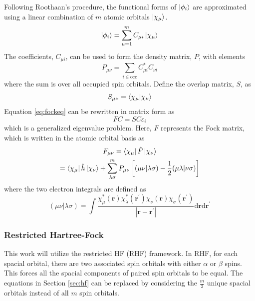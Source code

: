 \documentclass[final,3p,times,twocolumn]{elsarticle}
\begin{document}
Following Roothaan's procedure,\cite{roothaan} the functional forms of $\ket{\phi_i}$ are approximated using a linear combination of $m$ atomic orbitals $\ket{\chi_\mu}$.
\begin{equation}
\ket{\phi_i} = \sum_{\mu=1}^m C_{\mu i} \ket{\chi_\mu}
\end{equation}
The coefficients, $C_{\mu i}$, can be used to form the density matrix, $P$, with elements
\begin{equation} \label{eq:density}
P_{\mu \nu} = \sum_{i\in\text{occ}} C_{\mu i}^*C_{\nu i}
\end{equation}
where the sum is over all occupied spin orbitals. Define the overlap matrix, $S$, as
\begin{equation}
S_{\mu \nu} = \bra{\chi_\mu}\ket{\chi_\nu}
\end{equation}
Equation \eqref{eq:fockeq} can be rewritten in matrix form as
\begin{equation}\label{eq:fock}
FC = SC\varepsilon_i
\end{equation}
which is a generalized eigenvalue problem. Here, $F$ represents the Fock matrix, which is written in the atomic orbital basis as
\begin{equation} \label{eq:fockmat}
\begin{gathered}
F_{\mu\nu} = \bra{\chi_\mu} \hat F \ket{\chi_\nu} \\
= \bra{\chi_\mu} \hat h \ket{\chi_\nu} + \sum_{\lambda\sigma}^m P_{\mu\nu} \left[ (\mu\nu|\lambda\sigma) - \frac{1}{2}(\mu\lambda|\nu\sigma)\right]
\end{gathered}
\end{equation} 
where the two electron integrals are defined as
\begin{equation} \label{eq:2e}
(\mu\nu|\lambda\sigma) = \int \frac{\chi_\mu^*(\mathbf{r})\chi_\lambda^*(\mathbf{r}^\prime)\chi_\nu(\mathbf{r})\chi_\sigma(\mathbf{r}^\prime)}{|\mathbf{r}-\mathbf{r}^\prime|} \mathrm{d}\mathbf{r}\mathrm{d}\mathbf{r}^\prime
\end{equation}

\subsubsection{Restricted Hartree-Fock} \label{sec:rhf}
This work will utilize the restricted HF (RHF) framework. In RHF, for each spacial orbital, there are two associated spin orbitals with either $\alpha$ or $\beta$ spins. This forces all the spacial components of paired spin orbitals to be equal. The equations in Section \ref{sec:hf} can be replaced by considering the $\frac{m}{2}$ unique spacial orbitals instead of all $m$ spin orbitals.
\end{document}
